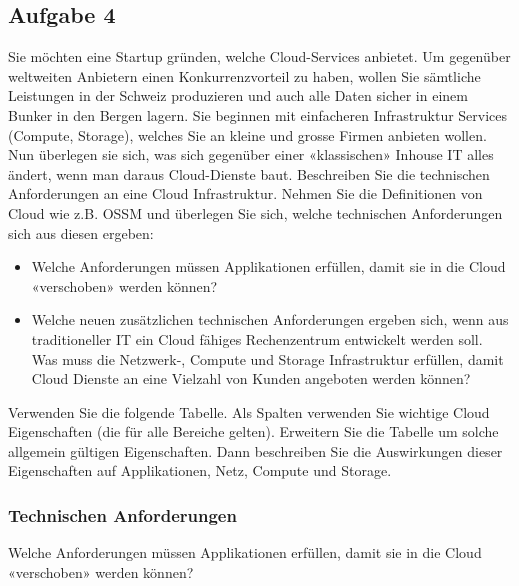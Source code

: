 \documentclass[11pt,titlepage]{article}
\newenvironment{shadedquotation}
 {\begin{shaded*}
  \quoting[leftmargin=0pt, vskip=0pt]
 }
 {\endquoting
 \end{shaded*}
}
\begin{document}
\subsection{Aufgabe 4}
\label{sec:Aufgabe-4}
\begin{shadedquotation}
  Sie möchten eine Startup gründen, welche Cloud-Services anbietet. Um gegenüber weltweiten
  Anbietern einen Konkurrenzvorteil zu haben, wollen Sie sämtliche Leistungen in der Schweiz
  produzieren und auch alle Daten sicher in einem Bunker in den Bergen lagern. Sie beginnen mit
  einfacheren Infrastruktur Services (Compute, Storage), welches Sie an kleine und grosse Firmen
  anbieten wollen. Nun überlegen sie sich, was sich gegenüber einer «klassischen» Inhouse IT alles ändert,
  wenn man daraus Cloud-Dienste baut. Beschreiben Sie die technischen Anforderungen an eine Cloud
  Infrastruktur. Nehmen Sie die Definitionen von Cloud wie z.B. OSSM und überlegen Sie sich, welche
  technischen Anforderungen sich aus diesen ergeben:

  \begin{itemize}
    \item Welche Anforderungen müssen Applikationen erfüllen, damit sie in die Cloud «verschoben» werden können?
    \item Welche neuen zusätzlichen technischen Anforderungen ergeben sich, wenn aus traditioneller IT
    ein Cloud fähiges Rechenzentrum entwickelt werden soll. Was muss die Netzwerk-, Compute
    und Storage Infrastruktur erfüllen, damit Cloud Dienste an eine Vielzahl von Kunden angeboten
    werden können?
  \end{itemize}

  Verwenden Sie die folgende Tabelle. Als Spalten verwenden Sie wichtige Cloud Eigenschaften (die für
  alle Bereiche gelten). Erweitern Sie die Tabelle um solche allgemein gültigen Eigenschaften. Dann
  beschreiben Sie die Auswirkungen dieser Eigenschaften auf Applikationen, Netz, Compute und Storage.
\end{shadedquotation}

\subsubsection{Technischen Anforderungen}
\label{sec:Aufgabe-4_technic}
\begin{shadedquotation}
  Welche Anforderungen müssen Applikationen erfüllen, damit sie in die Cloud «verschoben» werden können?
\end{shadedquotation}
\end{document}
